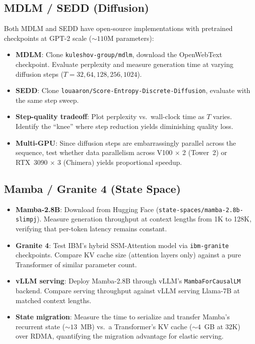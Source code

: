 \documentclass[11pt,letterpaper]{article}
\begin{document}
\subsection{MDLM / SEDD (Diffusion)}

Both MDLM and SEDD have open-source implementations with pretrained checkpoints at GPT-2 scale (${\sim}110$M parameters):

\begin{itemize}[noitemsep]
    \item \textbf{MDLM}: Clone \texttt{kuleshov-group/mdlm}, download the OpenWebText checkpoint. Evaluate perplexity and measure generation time at varying diffusion steps ($T = 32, 64, 128, 256, 1024$).
    \item \textbf{SEDD}: Clone \texttt{louaaron/Score-Entropy-Discrete-Diffusion}, evaluate with the same step sweep.
    \item \textbf{Step-quality tradeoff}: Plot perplexity vs.\ wall-clock time as $T$ varies. Identify the ``knee'' where step reduction yields diminishing quality loss.
    \item \textbf{Multi-GPU}: Since diffusion steps are embarrassingly parallel across the sequence, test whether data parallelism across V100 $\times$ 2 (Tower~2) or RTX~3090 $\times$ 3 (Chimera) yields proportional speedup.
\end{itemize}

\subsection{Mamba / Granite 4 (State Space)}

\begin{itemize}[noitemsep]
    \item \textbf{Mamba-2.8B}: Download from Hugging Face (\texttt{state-spaces/mamba-2.8b-slimpj}). Measure generation throughput at context lengths from 1K to 128K, verifying that per-token latency remains constant.
    \item \textbf{Granite 4}: Test IBM's hybrid SSM-Attention model via \texttt{ibm-granite} checkpoints. Compare KV cache size (attention layers only) against a pure Transformer of similar parameter count.
    \item \textbf{vLLM serving}: Deploy Mamba-2.8B through vLLM's \texttt{MambaForCausalLM} backend. Compare serving throughput against vLLM serving Llama-7B at matched context lengths.
    \item \textbf{State migration}: Measure the time to serialize and transfer Mamba's recurrent state (${\sim}13$~MB) vs.\ a Transformer's KV cache (${\sim}4$~GB at 32K) over RDMA, quantifying the migration advantage for elastic serving.
\end{itemize}
\end{document}
